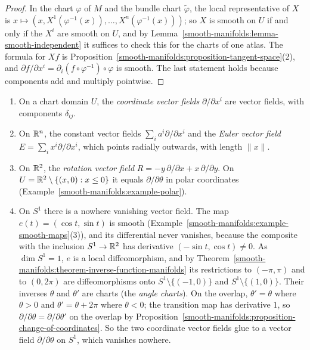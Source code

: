 \begin{proof}
In the chart $\varphi$ of $M$ and the bundle chart $\widetilde{\varphi}$, the local representative of $X$ is
$x \mapsto (x, X^1(\varphi^{-1}(x)), \ldots, X^n(\varphi^{-1}(x)))$; so $X$ is smooth on $U$ if and only if the $X^i$ are smooth on $U$, and by
Lemma~\ref{smooth-manifolds:lemma-smooth-independent} it suffices to check this for the charts of one atlas. The formula for $Xf$ is
Proposition~\ref{smooth-manifolds:proposition-tangent-space}(2), and $\partial f/\partial x^i = \partial_i(f \circ \varphi^{-1}) \circ \varphi$ is smooth. The last
statement holds because components add and multiply pointwise.
\end{proof}

\begin{example}\label{smooth-manifolds:example-vector-fields}
\begin{enumerate}
\item On a chart domain $U$, the \emph{coordinate vector fields} $\partial/\partial x^i$ are vector fields, with components $\delta_{ij}$.
\item On $\mathbb{R}^n$, the constant vector fields $\sum_ia^i\partial/\partial x^i$ and the \emph{Euler vector field} $E = \sum_ix^i\partial/\partial x^i$, which points
radially outwards, with length $\|x\|$.
\item On $\mathbb{R}^2$, the \emph{rotation vector field} $R = -y\,\partial/\partial x + x\,\partial/\partial y$. On $U = \mathbb{R}^2 \setminus \{(x, 0) : x \leq 0\}$ it
equals $\partial/\partial\theta$ in polar coordinates (Example~\ref{smooth-manifolds:example-polar}).
\item On $S^1$ there is a nowhere vanishing vector field. The map $e(t) = (\cos t, \sin t)$ is smooth
(Example~\ref{smooth-manifolds:example-smooth-maps}(3)), and its differential never vanishes, because the composite with the inclusion $S^1 \to \mathbb{R}^2$ has
derivative $(-\sin t, \cos t) \neq 0$. As $\dim S^1 = 1$, $e$ is a local diffeomorphism, and by
Theorem~\ref{smooth-manifolds:theorem-inverse-function-manifolds} its restrictions to $(-\pi, \pi)$ and to $(0, 2\pi)$ are diffeomorphisms onto
$S^1 \setminus \{(-1, 0)\}$ and $S^1 \setminus \{(1, 0)\}$. Their inverses $\theta$ and $\theta'$ are charts (the \emph{angle charts}). On the overlap,
$\theta' = \theta$ where $\theta > 0$ and $\theta' = \theta + 2\pi$ where $\theta < 0$; the transition map has derivative $1$, so
$\partial/\partial\theta = \partial/\partial\theta'$ on the overlap by Proposition~\ref{smooth-manifolds:proposition-change-of-coordinates}. So the two coordinate
vector fields glue to a vector field $\partial/\partial\theta$ on $S^1$, which vanishes nowhere.
\end{enumerate}
\end{example}


